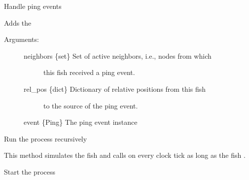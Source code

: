 \documentclass[letterpaper,10pt,english]{sphinxmanual}
\begin{document}
\begin{fulllineitems}
\begin{fulllineitems}
\begin{description}
\end{description}

\end{fulllineitems}


\begin{fulllineitems}
\label{\detokenize{index:fish.Fish.ping_handler}}
Handle ping events

Adds the
\begin{description}
\item[{Arguments:}] \leavevmode\begin{description}
\item[{neighbors \{set\} \textendash{} Set of active neighbors, i.e., nodes from which}] \leavevmode
this fish received a ping event.

\item[{rel\_pos \{dict\} \textendash{} Dictionary of relative positions from this fish}] \leavevmode
to the source of the ping event.

\end{description}

event \{Ping\} \textendash{} The ping event instance

\end{description}

\end{fulllineitems}


\begin{fulllineitems}
\label{\detokenize{index:fish.Fish.run}}
Run the process recursively

This method simulates the fish and calls  on every clock tick as
long as the fish .

\end{fulllineitems}


\begin{fulllineitems}
\label{\detokenize{index:fish.Fish.start}}
Start the process


\end{fulllineitems}
\end{fulllineitems}
\end{document}
